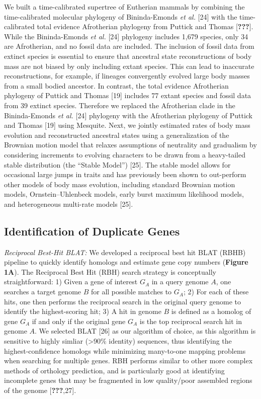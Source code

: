 \documentclass[10pt,letterpaper]{article}
\begin{document}
We built a time-calibrated supertree of Eutherian mammals by combining
the time-calibrated molecular phylogeny of Bininda-Emonds \emph{et al.}
{[}24{]} with the time-calibrated total evidence Afrotherian phylogeny
from Puttick and Thomas {[}{\textbf{???}}{]}. While the Bininda-Emonds
\emph{et al.} {[}24{]} phylogeny includes 1,679 species, only 34 are
Afrotherian, and no fossil data are included. The inclusion of fossil
data from extinct species is essential to ensure that ancestral state
reconstructions of body mass are not biased by only including extant
species. This can lead to inaccurate reconstructions, for example, if
lineages convergently evolved large body masses from a small bodied
ancestor. In contrast, the total evidence Afrotherian phylogeny of
Puttick and Thomas {[}19{]} includes 77 extant species and fossil data
from 39 extinct species. Therefore we replaced the Afrotherian clade in
the Bininda-Emonds \emph{et al.} {[}24{]} phylogeny with the Afrotherian
phylogeny of Puttick and Thomas {[}19{]} using Mesquite. Next, we
jointly estimated rates of body mass evolution and reconstructed
ancestral states using a generalization of the Brownian motion model
that relaxes assumptions of neutrality and gradualism by considering
increments to evolving characters to be drawn from a heavy-tailed stable
distribution (the ``Stable Model'') {[}25{]}. The stable model allows
for occasional large jumps in traits and has previously been shown to
out-perform other models of body mass evolution, including standard
Brownian motion models, Ornstein--Uhlenbeck models, early burst maximum
likelihood models, and heterogeneous multi-rate models {[}25{]}.

\hypertarget{identification-of-duplicate-genes}{%
\subsection{Identification of Duplicate
Genes}\label{identification-of-duplicate-genes}}

\emph{Reciprocal Best-Hit BLAT:} We developed a reciprocal best hit BLAT
(RBHB) pipeline to quickly identify homologs and estimate gene copy
numbers (\textbf{Figure 1A}). The Reciprocal Best Hit (RBH) search
strategy is conceptually straightforward: 1) Given a gene of interest
\(G_A\) in a query genome \(A\), one searches a target genome \(B\) for
all possible matches to \(G_A\); 2) For each of these hits, one then
performs the reciprocal search in the original query genome to identify
the highest-scoring hit; 3) A hit in genome \(B\) is defined as a
homolog of gene \(G_A\) if and only if the original gene \(G_A\) is the
top reciprocal search hit in genome \(A\). We selected BLAT {[}26{]} as
our algorithm of choice, as this algorithm is sensitive to highly
simliar (\textgreater{}90\% identity) sequences, thus identifying the
highest-confidence homologs while minimizing many-to-one mapping
problems when searching for multiple genes. RBH performs similar to
other more complex methods of orthology prediction, and is particularly
good at identifying incomplete genes that may be fragmented in low
quality/poor assembled regions of the genome {[}{\textbf{???}},27{]}.
\end{document}
